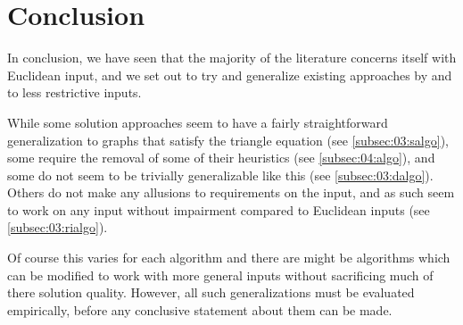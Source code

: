 \section{Conclusion}

In conclusion, we have seen that the majority of the literature concerns itself with Euclidean input,
and we set out to try and generalize existing approaches by \citeauthor{tsiligiridis_heuristic_1984} and \citeauthor{szwarc_novel_2022} to less restrictive inputs. 

While some solution approaches seem to have a fairly straightforward generalization to graphs that satisfy the triangle equation (see \cref{subsec:03:salgo}),
some require the removal of some of their heuristics (see \cref{subsec:04:algo}),
and some do not seem to be trivially generalizable like this (see \cref{subsec:03:dalgo}).
Others do not make any allusions to requirements on the input, and as such seem to work on any input without impairment compared to Euclidean inputs (see \cref{subsec:03:rialgo}).

Of course this varies for each algorithm and there are might be algorithms which can be modified to work with more general inputs without sacrificing much of there solution quality. 
However, all such generalizations must be evaluated empirically, before any conclusive statement about them can be made.
